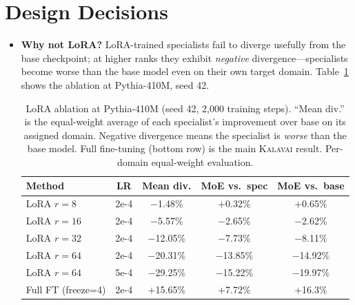 \documentclass{article}
\newcommand{\kalavai}{\textsc{Kalavai}\xspace}
\begin{document}
\section{Design Decisions}
\label{app:design}

\begin{itemize}[leftmargin=*, itemsep=4pt]
  \item \textbf{Why not LoRA?} LoRA-trained specialists fail to diverge usefully from the base checkpoint; at higher ranks they exhibit \emph{negative} divergence---specialists become worse than the base model even on their own target domain. Table~\ref{tab:lora} shows the ablation at Pythia-410M, seed 42.

\begin{table}[h]
\centering
\caption{LoRA ablation at Pythia-410M (seed 42, 2,000 training steps). ``Mean div.'' is the equal-weight average of each specialist's improvement over base on its assigned domain. Negative divergence means the specialist is \emph{worse} than the base model. Full fine-tuning (bottom row) is the main \kalavai result. Per-domain equal-weight evaluation.}
\label{tab:lora}
\small
\begin{tabular}{lcccc}
\toprule
\textbf{Method} & \textbf{LR} & \textbf{Mean div.} & \textbf{MoE vs.\ spec} & \textbf{MoE vs.\ base} \\
\midrule
LoRA $r=8$              & 2e-4 & $-$1.48\%  & $+$0.32\%  & $+$0.65\% \\
LoRA $r=16$             & 2e-4 & $-$5.57\%  & $-$2.65\%  & $-$2.62\% \\
LoRA $r=32$             & 2e-4 & $-$12.05\% & $-$7.73\%  & $-$8.11\% \\
LoRA $r=64$             & 2e-4 & $-$20.31\% & $-$13.85\% & $-$14.92\% \\
LoRA $r=64$             & 5e-4 & $-$29.25\% & $-$15.22\% & $-$19.97\% \\
\midrule
Full FT (freeze=4) & 2e-4 & $+$15.65\% & $+$7.72\%  & $+$16.3\% \\
\bottomrule
\end{tabular}
\end{table}


\end{itemize}
\end{document}
